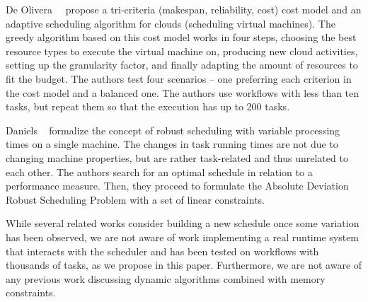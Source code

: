 \documentclass[conference]{IEEEtran}
\newcommand{\new}[1]{{\color{blue}#1}}
\begin{document}
De Olivera~\etal~\cite{de2012provenance} propose a tri-criteria (makespan, reliability, cost) \new{cost model and an adaptive
 scheduling algorithm for clouds (scheduling virtual machines).
The greedy algorithm based on this cost model  works in four steps, choosing the best resource types to execute the virtual
machine on, producing new cloud activities, setting up the granularity factor, and finally adapting the amount of resources
to fit the budget.}
The authors test four scenarios -- one preferring each criterion in the cost model and a balanced one.
The authors use workflows with less than ten tasks, but repeat them so that the execution has up to 200 tasks.


Daniels \etal~\cite{daniels1995robust} formalize the concept of robust scheduling with variable processing times
on a single machine.
The changes in task running times are not due to changing machine properties, but are rather task-related
and thus unrelated to each other.
The authors search for an optimal schedule
in relation to a performance measure. %
Then, they proceed to formulate the Absolute Deviation Robust Scheduling Problem \new{with} a set of linear constraints.
    

While several related works consider building a new schedule once some variation has been observed,
we are not aware of work implementing a real runtime system that interacts with the scheduler
and has been tested on workflows with thousands of tasks, as we propose in this paper. Furthermore, 
we are not aware of any previous work discussing dynamic algorithms combined with memory constraints. 
\end{document}
